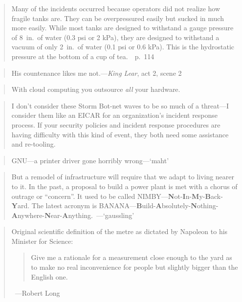 \documentclass[a4paper]{article}
\begin{document}
\medskip
\begin{quote}
	Many of the incidents occurred because operators did not realize
	how fragile tanks are.  They can be overpressured easily but sucked
	in much more easily.  While most tanks are designed to withstand a
	gauge pressure of 8~in.\ of water (0.3 psi or 2 kPa), they are
	designed to withstand a vacuum of only 2~in.\ of
	water (0.1 psi or 0.6 kPa).  This is the hydrostatic pressure at the
	bottom of a cup of tea.~\cite{Kletz1999}~p.~114
\end{quote}

\medskip
\begin{quote}
	His countenance likes me not.---\emph{King Lear}, act 2, scene 2
\end{quote}

\medskip
\begin{quote}
	With cloud computing you outsource \emph{all} your hardware.~\cite{Slashdot2008a}
\end{quote}

\medskip
\begin{quote}
	I don't consider these Storm Bot-net waves to be so much of
	a threat---I consider them like an EICAR for an organization's
	incident response process.  If your security policies and
	incident response procedures are having difficulty with this
	kind of event, they both need some assistance and re-tooling.~\cite{Liston2008}
\end{quote}

\medskip
\begin{quote}
	GNU---a printer driver gone horribly wrong---`maht'~\cite{maht2008}
\end{quote}

\medskip
\begin{quote}
	But a remodel of infrastructure will require that we adapt to
	living nearer to it. In the past, a proposal to build a power
	plant is met with a chorus of outrage or ``concern''.  It used
	to be called NIMBY---\textbf{N}ot-\textbf{I}n-\textbf{M}y-\textbf{B}ack-\textbf{Y}ard.
	The latest acronym is BANANA---\textbf{B}uild-\textbf{A}bsolutely-\textbf{N}othing-\textbf{A}nywhere-\textbf{N}ear-\textbf{A}nything.~---`gaussling'~\cite{gaussling2008}
\end{quote}

\medskip
\begin{quote}
	Original scientific definition of the metre as dictated by
	Napoleon to his Minister for Science:
	\begin{quote}
		Give me a rationale for a measurement close enough to
		the yard as to make no real inconvenience for people
		but slightly bigger than the English one.
	\end{quote}~---Robert Long~\cite{Long2008}
\end{quote}
\end{document}
